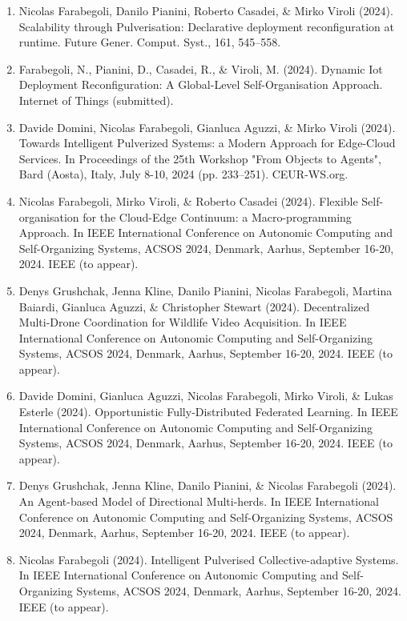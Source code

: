 \documentclass[runningheads]{llncs}
\begin{document}
\begin{enumerate}
    \item Nicolas Farabegoli, Danilo Pianini, Roberto Casadei, \& Mirko Viroli (2024). Scalability through Pulverisation: Declarative deployment reconfiguration at runtime. Future Gener. Comput. Syst., 161, 545–558.    
    \item Farabegoli, N., Pianini, D., Casadei, R., \& Viroli, M. (2024). Dynamic Iot Deployment Reconfiguration: A Global-Level Self-Organisation Approach. Internet of Things (submitted).
    \item Davide Domini, Nicolas Farabegoli, Gianluca Aguzzi, \& Mirko Viroli (2024). Towards Intelligent Pulverized Systems: a Modern Approach for Edge-Cloud Services. In Proceedings of the 25th Workshop "From Objects to Agents", Bard (Aosta), Italy, July 8-10, 2024 (pp. 233–251). CEUR-WS.org.
    \item Nicolas Farabegoli, Mirko Viroli, \& Roberto Casadei (2024). Flexible Self-organisation for the Cloud-Edge Continuum: a Macro-programming Approach. In IEEE International Conference on Autonomic Computing and Self-Organizing Systems, ACSOS 2024, Denmark, Aarhus, September 16-20, 2024. IEEE (to appear).
    \item Denys Grushchak, Jenna Kline, Danilo Pianini, Nicolas Farabegoli, Martina Baiardi, Gianluca Aguzzi, \& Christopher Stewart (2024). Decentralized Multi-Drone Coordination for Wildlife Video Acquisition. In IEEE International Conference on Autonomic Computing and Self-Organizing Systems, ACSOS 2024, Denmark, Aarhus, September 16-20, 2024. IEEE (to appear).   
    \item Davide Domini, Gianluca Aguzzi, Nicolas Farabegoli, Mirko Viroli, \& Lukas Esterle (2024). Opportunistic Fully-Distributed Federated Learning. In IEEE International Conference on Autonomic Computing and Self-Organizing Systems, ACSOS 2024, Denmark, Aarhus, September 16-20, 2024. IEEE (to appear).
    \item Denys Grushchak, Jenna Kline, Danilo Pianini, \& Nicolas Farabegoli (2024). An Agent-based Model of Directional Multi-herds. In IEEE International Conference on Autonomic Computing and Self-Organizing Systems, ACSOS 2024, Denmark, Aarhus, September 16-20, 2024. IEEE (to appear).
    \item Nicolas Farabegoli (2024). Intelligent Pulverised Collective-adaptive Systems. In IEEE International Conference on Autonomic Computing and Self-Organizing Systems, ACSOS 2024, Denmark, Aarhus, September 16-20, 2024. IEEE (to appear).
\end{enumerate}
\end{document}
